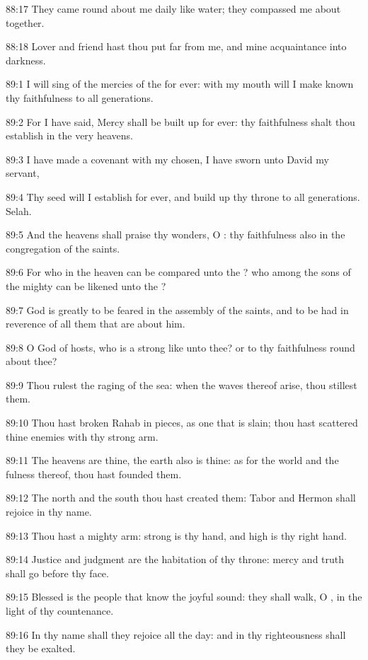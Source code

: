 88:17 They came round about me daily like water; they compassed me about together.

88:18 Lover and friend hast thou put far from me, and mine acquaintance into darkness.



89:1 I will sing of the mercies of the \LORD for ever: with my mouth will I make known thy faithfulness to all generations.

89:2 For I have said, Mercy shall be built up for ever: thy faithfulness shalt thou establish in the very heavens.

89:3 I have made a covenant with my chosen, I have sworn unto David my servant,

89:4 Thy seed will I establish for ever, and build up thy throne to all generations. Selah.

89:5 And the heavens shall praise thy wonders, O \LORD: thy faithfulness also in the congregation of the saints.

89:6 For who in the heaven can be compared unto the \LORD? who among the sons of the mighty can be likened unto the \LORD?

89:7 God is greatly to be feared in the assembly of the saints, and to be had in reverence of all them that are about him.

89:8 O \LORD God of hosts, who is a strong \LORD like unto thee? or to thy faithfulness round about thee?

89:9 Thou rulest the raging of the sea: when the waves thereof arise, thou stillest them.

89:10 Thou hast broken Rahab in pieces, as one that is slain; thou hast scattered thine enemies with thy strong arm.

89:11 The heavens are thine, the earth also is thine: as for the world and the fulness thereof, thou hast founded them.

89:12 The north and the south thou hast created them: Tabor and Hermon shall rejoice in thy name.

89:13 Thou hast a mighty arm: strong is thy hand, and high is thy right hand.

89:14 Justice and judgment are the habitation of thy throne: mercy and truth shall go before thy face.

89:15 Blessed is the people that know the joyful sound: they shall walk, O \LORD, in the light of thy countenance.

89:16 In thy name shall they rejoice all the day: and in thy righteousness shall they be exalted.

